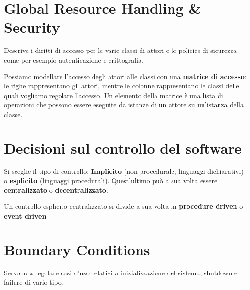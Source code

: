     \section{Global Resource Handling \& Security}
        Descrive i diritti di accesso per le varie classi di attori e le policies di sicurezza come per esempio autenticazione e crittografia.
        
        Possiamo modellare l'accesso degli attori alle classi con una \textbf{matrice di accesso}: le righe rappresentano gli attori, mentre le colonne rappresentano le classi delle quali vogliamo regolare l'accesso. Un elemento della matrice è una lista di operazioni che possono essere eseguite da istanze di un attore su un'istanza della classe.
        
    \section{Decisioni sul controllo del software}
        Si sceglie il tipo di controllo: \textbf{Implicito} (non procedurale, linguaggi dichiarativi) o \textbf{esplicito} (linguaggi procedurali). Quest'ultimo può a sua volta essere \textbf{centralizzato} o \textbf{decentralizzato}.
        
        Un controllo esplicito centralizzato si divide a sua volta in \textbf{procedure driven} o \textbf{event driven}
        
    \section{Boundary Conditions}
        Servono a regolare casi d'uso relativi a inizializzazione del sistema, shutdown e failure di vario tipo.